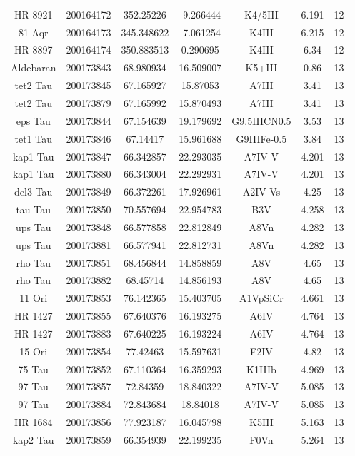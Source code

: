 \begin{table*}
\begin{tabular}{ccccccc}
HR 8921 & 200164172 & 352.25226 & -9.266444 & K4/5III & 6.191 & 12 \\
81 Aqr & 200164173 & 345.348622 & -7.061254 & K4III & 6.215 & 12 \\
HR 8897 & 200164174 & 350.883513 & 0.290695 & K4III & 6.34 & 12 \\
Aldebaran & 200173843 & 68.980934 & 16.509007 & K5+III & 0.86 & 13 \\
tet2 Tau & 200173845 & 67.165927 & 15.87053 & A7III & 3.41 & 13 \\
tet2 Tau & 200173879 & 67.165992 & 15.870493 & A7III & 3.41 & 13 \\
eps Tau & 200173844 & 67.154639 & 19.179692 & G9.5IIICN0.5 & 3.53 & 13 \\
tet1 Tau & 200173846 & 67.14417 & 15.961688 & G9IIIFe-0.5 & 3.84 & 13 \\
kap1 Tau & 200173847 & 66.342857 & 22.293035 & A7IV-V & 4.201 & 13 \\
kap1 Tau & 200173880 & 66.343004 & 22.292931 & A7IV-V & 4.201 & 13 \\
del3 Tau & 200173849 & 66.372261 & 17.926961 & A2IV-Vs & 4.25 & 13 \\
tau Tau & 200173850 & 70.557694 & 22.954783 & B3V & 4.258 & 13 \\
ups Tau & 200173848 & 66.577858 & 22.812849 & A8Vn & 4.282 & 13 \\
ups Tau & 200173881 & 66.577941 & 22.812731 & A8Vn & 4.282 & 13 \\
rho Tau & 200173851 & 68.456844 & 14.858859 & A8V & 4.65 & 13 \\
rho Tau & 200173882 & 68.45714 & 14.856193 & A8V & 4.65 & 13 \\
11 Ori & 200173853 & 76.142365 & 15.403705 & A1VpSiCr & 4.661 & 13 \\
HR 1427 & 200173855 & 67.640376 & 16.193275 & A6IV & 4.764 & 13 \\
HR 1427 & 200173883 & 67.640225 & 16.193224 & A6IV & 4.764 & 13 \\
15 Ori & 200173854 & 77.42463 & 15.597631 & F2IV & 4.82 & 13 \\
75 Tau & 200173852 & 67.110364 & 16.359293 & K1IIIb & 4.969 & 13 \\
97 Tau & 200173857 & 72.84359 & 18.840322 & A7IV-V & 5.085 & 13 \\
97 Tau & 200173884 & 72.843684 & 18.84018 & A7IV-V & 5.085 & 13 \\
HR 1684 & 200173856 & 77.923187 & 16.045798 & K5III & 5.163 & 13 \\
kap2 Tau & 200173859 & 66.354939 & 22.199235 & F0Vn & 5.264 & 13 \\

\end{tabular}
\end{table*}
